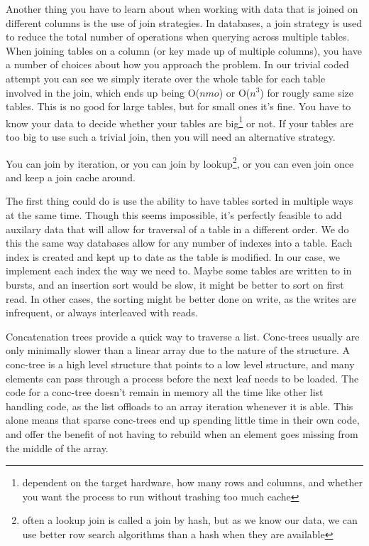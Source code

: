 Another thing you have to learn about when working with data that is joined on
different columns is the use of join strategies. In databases, a join strategy
is used to reduce the total number of operations when querying across multiple
tables. When joining tables on a column (or key made up of multiple columns),
you have a number of choices about how you approach the problem. In our trivial
coded attempt you can see we simply iterate over the whole table for each table
involved in the join, which ends up being O($nmo$) or O($n^3$) for rougly same
size tables. This is no good for large tables, but for small ones it's fine.
You have to know your data to decide whether your tables are
big\footnote{dependent on the target hardware, how many rows and columns, and
whether you want the process to run without trashing too much cache} or not. If
your tables are too big to use such a trivial join, then you will need an
alternative strategy.

You can join by iteration, or you can join by lookup\footnote{often a lookup
join is called a join by hash, but as we know our data, we can use better row
search algorithms than a hash when they are available}, or you can even join
once and keep a join cache around.

The first thing could do is use the ability to have tables sorted in multiple
ways at the same time. Though this seems impossible, it's perfectly feasible to
add auxilary data that will allow for traversal of a table in a different
order. We do this the same way databases allow for any number of indexes into a
table. Each index is created and kept up to date as the table is modified. In
our case, we implement each index the way we need to. Maybe some tables are
written to in bursts, and an insertion sort would be slow, it might be better
to sort on first read. In other cases, the sorting might be better done on
write, as the writes are infrequent, or always interleaved with reads.

Concatenation trees provide a quick way to traverse a list. Conc-trees usually
are only minimally slower than a linear array due to the nature of the
structure. A conc-tree is a high level structure that points to a low level
structure, and many elements can pass through a process before the next leaf
needs to be loaded. The code for a conc-tree doesn't remain in memory all the
time like other list handling code, as the list offloads to an array iteration
whenever it is able. This alone means that sparse conc-trees end up spending
little time in their own code, and offer the benefit of not having to rebuild
when an element goes missing from the middle of the array.

